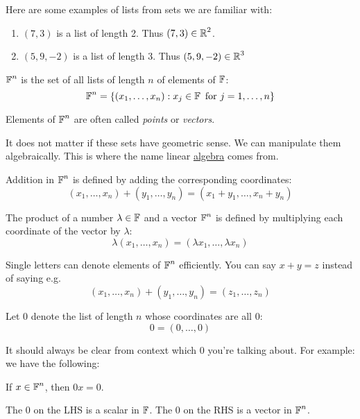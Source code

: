 Here are some examples of lists from sets we are familiar with:
\begin{enumerate}
    \item $(7, 3)$ is a list of length 2. Thus $(7, 3) \in \operatorname{\mathbb{R}}^2$.
    \item $(5, 9, -2)$ is a list of length 3. Thus $(5, 9, -2) \in \operatorname{\mathbb{R}}^3$
\end{enumerate}

\begin{definition}
    $\operatorname{\mathbb{F}}^n$ is the set of all lists of length $n$ of elements of $\operatorname{\mathbb{F}}$:
    \[ \operatorname{\mathbb{F}}^n = \{(x_1, \ldots, x_n) : x_j \in \operatorname{\mathbb{F}} \text{ for } j = 1, \ldots, n\} \]
\end{definition}

Elements of $\operatorname{\mathbb{F}}^n$ are often called \textit{points} or \textit{vectors}. 

It does not matter if these sets have geometric sense. We can manipulate them algebraically.
This is where the name linear \underline{algebra} comes from.

\begin{definition}
    Addition in $\operatorname{\mathbb{F}}^n$ is defined by adding the corresponding coordinates:
    \[ (x_1, \ldots, x_n) + (y_1, \ldots, y_n) = (x_1+y_1, \ldots, x_n+y_n) \]
\end{definition}

\begin{definition}
    The product of a number $\lambda \in \operatorname{\mathbb{F}}$ and a vector $\operatorname{\mathbb{F}}^n$ is defined by
    multiplying each coordinate of the vector by $\lambda$:
    \[\lambda (x_1, \ldots, x_n) = (\lambda x_1, \ldots, \lambda x_n) \] 
\end{definition}

Single letters can denote elements of $\operatorname{\mathbb{F}}^n$ efficiently. You can say $x + y = z$ instead of saying e.g.
\[ (x_1, \ldots, x_n) + (y_1, \ldots, y_n) = (z_1, \ldots, z_n) \]

\begin{definition}
    Let 0 denote the list of length $n$ whose coordinates are all 0:
    \[ 0 = (0, \ldots, 0) \]
\end{definition}

It should always be clear from context which 0 you're talking about. For example:
we have the following:
\begin{theorem*}
    If $x \in \operatorname{\mathbb{F}}^n$, then $0x = 0$.
\end{theorem*}

The 0 on the LHS is a scalar in $\operatorname{\mathbb{F}}$. The 0 on the RHS is a vector in $\operatorname{\mathbb{F}}^n$.

